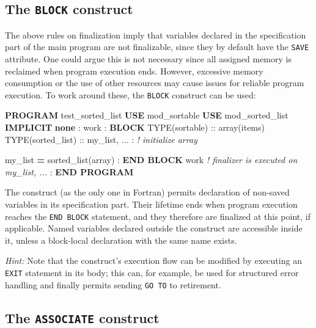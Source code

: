 \documentclass[
  paper=a4,
  ,captions=tableheading
]{scrartcl}
\newenvironment{Shaded}{\begin{snugshade}}{\end{snugshade}}
\newcommand{\CommentTok}[1]{\textcolor[rgb]{0.56,0.35,0.01}{\textit{#1}}}
\newcommand{\DataTypeTok}[1]{\textcolor[rgb]{0.13,0.29,0.53}{#1}}
\newcommand{\KeywordTok}[1]{\textcolor[rgb]{0.13,0.29,0.53}{\textbf{#1}}}
\newcommand{\NormalTok}[1]{#1}
\begin{document}
\subsection{\texorpdfstring{The \texttt{BLOCK}
construct}{The BLOCK construct}}\label{the-block-construct}

The above rules on finalization imply that variables declared in the
specification part of the main program are not finalizable, since they
by default have the \texttt{SAVE} attribute. One could argue this is not
necessary since all assigned memory is reclaimed when program execution
ends. However, excessive memory consumption or the use of other
resources may cause issues for reliable program execution. To work
around these, the \texttt{BLOCK} construct can be used:

\begin{Shaded}
\begin{Highlighting}[]
\KeywordTok{PROGRAM}\NormalTok{ test\_sorted\_list}
   \KeywordTok{USE}\NormalTok{ mod\_sortable}
   \KeywordTok{USE}\NormalTok{ mod\_sorted\_list}
   \KeywordTok{IMPLICIT} \KeywordTok{none}
\NormalTok{   :}
\NormalTok{   work : }\KeywordTok{BLOCK}
      \DataTypeTok{TYPE(sortable)} \DataTypeTok{::}\NormalTok{ array(items)}
      \DataTypeTok{TYPE(sorted\_list)} \DataTypeTok{::}\NormalTok{ my\_list, ...}
\NormalTok{      : }\CommentTok{! initialize array}

\NormalTok{      my\_list }\KeywordTok{=}\NormalTok{ sorted\_list(array)}
\NormalTok{      :}
   \KeywordTok{END BLOCK}\NormalTok{ work  }\CommentTok{! finalizer is executed on my\_list, ...}
\NormalTok{   :}
\KeywordTok{END PROGRAM}
\end{Highlighting}
\end{Shaded}

The construct (as the only one in Fortran) permits declaration of
non-saved variables in its specification part. Their lifetime ends when
program execution reaches the \texttt{END\ BLOCK} statement, and they
therefore are finalized at this point, if applicable. Named variables
declared outside the construct are accessible inside it, unless a
block-local declaration with the same name exists.

\emph{Hint:} Note that the construct's execution flow can be modified by
executing an \texttt{EXIT} statement in its body; this can, for example,
be used for structured error handling and finally permits sending
\texttt{GO\ TO} to retirement.

\subsection{\texorpdfstring{The \texttt{ASSOCIATE}
construct}{The ASSOCIATE construct}}\label{the-associate-construct}
\end{document}
